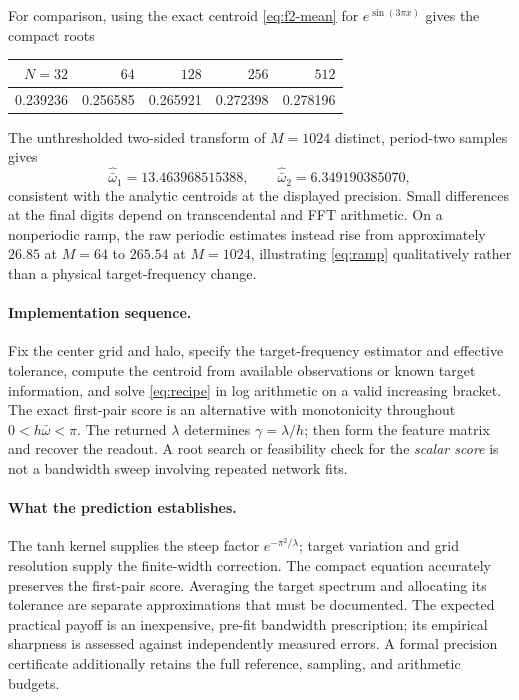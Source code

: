 \documentclass[11pt]{article}
\theoremstyle{definition}\newtheorem{definition}[theorem]{Definition}
\theoremstyle{remark}\newtheorem{remark}[theorem]{Remark}
\numberwithin{equation}{section}
\begin{document}
For comparison, using the exact centroid \eqref{eq:f2-mean} for $e^{\sin(3\pi x)}$ gives the compact roots
\begin{center}
\begin{tabular}{r r r r r}
\toprule
$N=32$ & $64$ & $128$ & $256$ & $512$\\
\midrule
0.239236 & 0.256585 & 0.265921 & 0.272398 & 0.278196\\
\bottomrule
\end{tabular}
\end{center}
The unthresholded two-sided transform of $M=1024$ distinct, period-two samples gives
\[
 \widehat{\bar\omega}_1=13.463968515388,\qquad
 \widehat{\bar\omega}_2=6.349190385070,
\]
consistent with the analytic centroids at the displayed precision. Small differences at the final digits depend on transcendental and FFT arithmetic. On a nonperiodic ramp, the raw periodic estimates instead rise from approximately $26.85$ at $M=64$ to $265.54$ at $M=1024$, illustrating \eqref{eq:ramp} qualitatively rather than a physical target-frequency change.

\paragraph{Implementation sequence.}
Fix the center grid and halo, specify the target-frequency estimator and effective tolerance, compute the centroid from available observations or known target information, and solve \eqref{eq:recipe} in log arithmetic on a valid increasing bracket. The exact first-pair score is an alternative with monotonicity throughout $0<h\bar\omega<\pi$. The returned $\lambda$ determines $\gamma=\lambda/h$; then form the feature matrix and recover the readout. A root search or feasibility check for the \emph{scalar score} is not a bandwidth sweep involving repeated network fits.

\paragraph{What the prediction establishes.}
The tanh kernel supplies the steep factor $e^{-\pi^2/\lambda}$; target variation and grid resolution supply the finite-width correction. The compact equation accurately preserves the first-pair score. Averaging the target spectrum and allocating its tolerance are separate approximations that must be documented. The expected practical payoff is an inexpensive, pre-fit bandwidth prescription; its empirical sharpness is assessed against independently measured errors. A formal precision certificate additionally retains the full reference, sampling, and arithmetic budgets.
\end{document}
